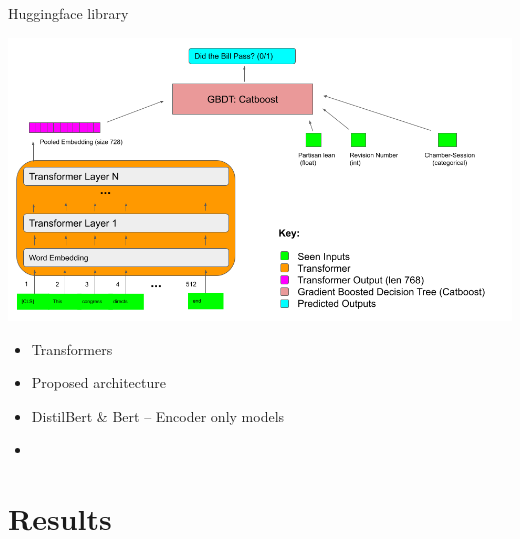 \documentclass[11pt]{article}
\begin{document}



Huggingface library \cite{huggingface}

\includegraphics[width=150mm]{figures/network_architecture.jpg}


\begin{itemize}
  \item Transformers
  \item Proposed architecture
  \item DistilBert & Bert  -- Encoder only models
  \item 
\end{itemize}



\section{Results}
\end{document}
